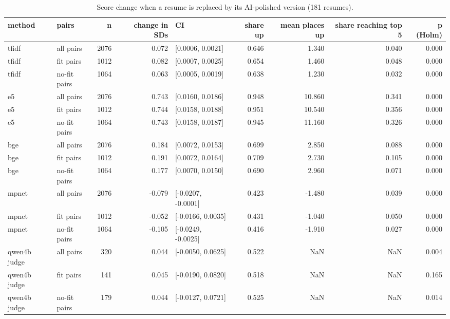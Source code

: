\begin{table}
\caption{Score change when a resume is replaced by its AI-polished version (181 resumes).}
\label{tab:t8_polish}
\begin{tabular}{llrrlrrrr}
\toprule
method & pairs & n & change in SDs & CI & share up & mean places up & share reaching top 5 & p (Holm) \\
\midrule
tfidf & all pairs & 2076 & 0.072 & [0.0006, 0.0021] & 0.646 & 1.340 & 0.040 & 0.000 \\
tfidf & fit pairs & 1012 & 0.082 & [0.0007, 0.0025] & 0.654 & 1.460 & 0.048 & 0.000 \\
tfidf & no-fit pairs & 1064 & 0.063 & [0.0005, 0.0019] & 0.638 & 1.230 & 0.032 & 0.000 \\
e5 & all pairs & 2076 & 0.743 & [0.0160, 0.0186] & 0.948 & 10.860 & 0.341 & 0.000 \\
e5 & fit pairs & 1012 & 0.744 & [0.0158, 0.0188] & 0.951 & 10.540 & 0.356 & 0.000 \\
e5 & no-fit pairs & 1064 & 0.743 & [0.0158, 0.0187] & 0.945 & 11.160 & 0.326 & 0.000 \\
bge & all pairs & 2076 & 0.184 & [0.0072, 0.0153] & 0.699 & 2.850 & 0.088 & 0.000 \\
bge & fit pairs & 1012 & 0.191 & [0.0072, 0.0164] & 0.709 & 2.730 & 0.105 & 0.000 \\
bge & no-fit pairs & 1064 & 0.177 & [0.0070, 0.0150] & 0.690 & 2.960 & 0.071 & 0.000 \\
mpnet & all pairs & 2076 & -0.079 & [-0.0207, -0.0001] & 0.423 & -1.480 & 0.039 & 0.000 \\
mpnet & fit pairs & 1012 & -0.052 & [-0.0166, 0.0035] & 0.431 & -1.040 & 0.050 & 0.000 \\
mpnet & no-fit pairs & 1064 & -0.105 & [-0.0249, -0.0025] & 0.416 & -1.910 & 0.027 & 0.000 \\
qwen4b judge & all pairs & 320 & 0.044 & [-0.0050, 0.0625] & 0.522 & NaN & NaN & 0.004 \\
qwen4b judge & fit pairs & 141 & 0.045 & [-0.0190, 0.0820] & 0.518 & NaN & NaN & 0.165 \\
qwen4b judge & no-fit pairs & 179 & 0.044 & [-0.0127, 0.0721] & 0.525 & NaN & NaN & 0.014 \\
\bottomrule
\end{tabular}
\end{table}
